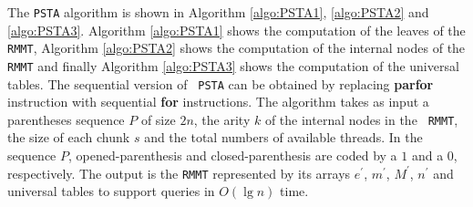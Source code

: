 The {\tt PSTA} algorithm is shown in Algorithm \ref{algo:PSTA1},
\ref{algo:PSTA2} and \ref{algo:PSTA3}. Algorithm \ref{algo:PSTA1}
shows the computation of the leaves of the {\tt RMMT}, Algorithm
\ref{algo:PSTA2} shows the computation of the internal nodes of the
{\tt RMMT} and finally Algorithm \ref{algo:PSTA3} shows the
computation of the universal tables. The sequential version of {\tt
  PSTA} can be obtained by replacing {\bf parfor} instruction with
sequential {\bf for} instructions. The algorithm takes as input a parentheses
sequence $P$ of size $2n$, the arity $k$ of the internal nodes in the {\tt
  RMMT}, the size of each chunk $s$ and the total numbers of available
threads. In the sequence $P$, opened-parenthesis and
closed-parenthesis are coded by a $1$ and a $0$, respectively. The
output is the {\tt RMMT} represented by its arrays $e^{\prime}$,
$m^{\prime}$, $M^{\prime}$, $n^{\prime}$ and universal tables to
support queries in $O(\lg n)$ time.


